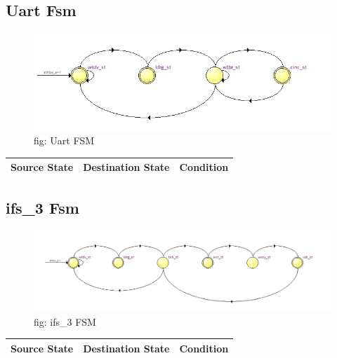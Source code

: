 \documentclass[12pt,a4 paper] {article}
\begin{document}
\subsection{Uart Fsm}
\begin{figure}[h]
	\centering	
	\includegraphics[scale=0.5]{../png/Uart.png}
	\newline
	fig: Uart FSM\\
\end{figure}
\begin{center}
	\begin{tabular}{| p{2cm} | p{2cm} | p{11cm} |}
		\hline
		Source State& Destination State & Condition \\
		\hline	
		
		
	\end{tabular}	
\end{center}
\newpage
\subsection{ifs\_3 Fsm}
\begin{figure}[h]
	\centering	
	\includegraphics[scale=0.4]{../png/ifs_3.png}
	\newline
	fig: ifs\_3 FSM\\
\end{figure}
\begin{center}
	\begin{tabular}{| p{2cm} | p{2cm} | p{11cm} |}
		\hline
		Source State& Destination State & Condition \\
		\hline	
		
		
	\end{tabular}	
\end{center}
\end{document}
